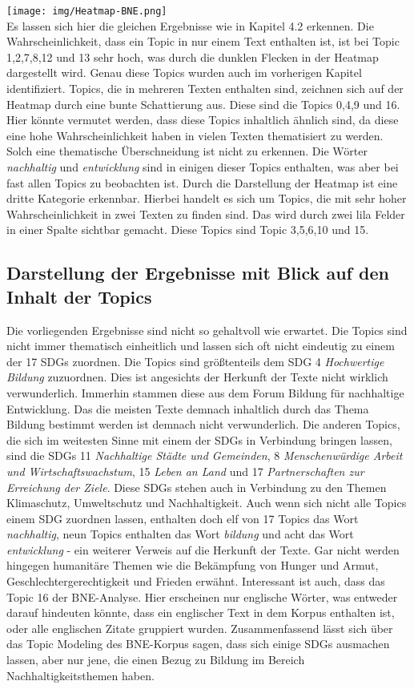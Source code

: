 \documentclass[letterpaper]{article}
\begin{document}
\texttt{[image: img/Heatmap-BNE.png]}\\
Es lassen sich hier die gleichen Ergebnisse wie in Kapitel 4.2 erkennen. Die Wahrscheinlichkeit, dass ein Topic in nur einem Text enthalten ist, ist bei Topic 1,2,7,8,12 und 13 sehr hoch, was durch die dunklen Flecken in der Heatmap dargestellt wird. Genau diese Topics wurden auch im vorherigen Kapitel identifiziert. Topics, die in mehreren Texten enthalten sind, zeichnen sich auf der Heatmap durch eine bunte Schattierung aus. Diese sind die Topics 0,4,9 und 16. Hier könnte vermutet werden, dass diese Topics inhaltlich ähnlich sind, da diese eine hohe Wahrscheinlichkeit haben in vielen Texten thematisiert zu werden. Solch eine thematische Überschneidung ist nicht zu erkennen. Die Wörter \textit{nachhaltig} und \textit{entwicklung} sind in einigen dieser Topics enthalten, was aber bei fast allen Topics zu beobachten ist. Durch die Darstellung der Heatmap ist eine dritte Kategorie erkennbar. Hierbei handelt es sich um Topics, die mit sehr hoher Wahrscheinlichkeit in zwei Texten zu finden sind. Das wird durch zwei lila Felder in einer Spalte sichtbar gemacht. Diese Topics sind Topic 3,5,6,10 und 15.

\subsection{Darstellung der Ergebnisse mit Blick auf den Inhalt der Topics}
Die vorliegenden Ergebnisse sind nicht so gehaltvoll wie erwartet. Die Topics sind nicht immer thematisch einheitlich und lassen sich oft nicht eindeutig zu einem der 17 SDGs zuordnen. Die Topics sind größtenteils dem SDG 4 \textit{Hochwertige Bildung} zuzuordnen. Dies ist angesichts der Herkunft der Texte nicht wirklich verwunderlich. Immerhin stammen diese aus dem Forum Bildung für nachhaltige Entwicklung. Das die meisten Texte demnach inhaltlich durch das Thema Bildung bestimmt werden ist demnach nicht verwunderlich. Die anderen Topics, die sich im weitesten Sinne mit einem der SDGs in Verbindung bringen lassen, sind die SDGs 11 \textit{Nachhaltige Städte und Gemeinden}, 8 \textit{Menschenwürdige Arbeit und Wirtschaftswachstum}, 15 \textit{Leben an Land} und 17 \textit{Partnerschaften zur Erreichung der Ziele}. Diese SDGs stehen auch in Verbindung zu den Themen Klimaschutz, Umweltschutz und Nachhaltigkeit. Auch wenn sich nicht alle Topics einem SDG zuordnen lassen, enthalten doch elf von 17 Topics das Wort \textit{nachhaltig}, neun Topics enthalten das Wort \textit{bildung} und acht das Wort \textit{entwicklung} - ein weiterer Verweis auf die Herkunft der Texte. Gar nicht werden hingegen humanitäre Themen wie die Bekämpfung von Hunger und Armut, Geschlechtergerechtigkeit und Frieden erwähnt. Interessant ist auch, dass das Topic 16 der BNE-Analyse. Hier erscheinen nur englische Wörter, was entweder darauf hindeuten könnte, dass ein englischer Text in dem Korpus enthalten ist, oder alle englischen Zitate gruppiert wurden. Zusammenfassend lässt sich über das Topic Modeling des BNE-Korpus sagen, dass sich einige SDGs ausmachen lassen, aber nur jene, die einen Bezug zu Bildung im Bereich Nachhaltigkeitsthemen haben. 
\end{document}
